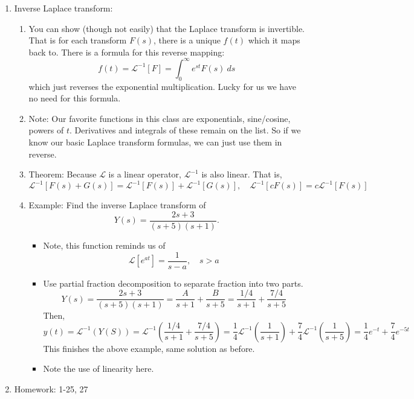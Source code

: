\documentclass{article}
\begin{document}
\begin{enumerate}
\item Inverse Laplace transform: 
\begin{enumerate}
\item You can show (though not easily) that the Laplace transform is invertible. That is for each transform $F(s)$, there is a unique $f(t)$ which it maps back to. There is a formula for this reverse mapping:
\[
f(t) =\mathcal{L}^{-1}[F] = \int_0^{\infty} e^{st} F(s) ~ds
\]
which just reverses the exponential multiplication. Lucky for us we have no need for this formula.
\item Note: Our favorite functions in this class are exponentials, sine/cosine, powers of $t$. Derivatives and integrals of these remain on the list. So if we know our basic Laplace transform formulas, we can just use them in reverse.
\item Theorem: Because $\mathcal{L}$ is a linear operator, $\mathcal{L}^{-1}$ is also linear. That is,
\[
\mathcal{L}^{-1}\left[ F(s)+G(s) \right] = \mathcal{L}^{-1}\left[ F(s) \right]+\mathcal{L}^{-1}\left[ G(s) \right], \quad
\mathcal{L}^{-1}\left[ cF(s) \right] = c\mathcal{L}^{-1}\left[ F(s) \right]
\]
\item Example: Find the inverse Laplace transform of 
\[
Y(s) = \frac{2s+3}{(s+5)(s+1)}.
\]
\begin{itemize}
\item Note, this function reminds us of
\[
\mathcal{L}[e^{at}] = \frac{1}{s-a}, \quad s>a
\]
\item Use partial fraction decomposition to separate fraction into two parts.
\[
Y(s) = \frac{2s+3}{(s+5)(s+1)} = \frac{A}{s+1}+\frac{B}{s+5} 
= \frac{1/4}{s+1}+\frac{7/4}{s+5} 
\]
Then, 
\[
y(t) = \mathcal{L}^{-1}(Y(S))
= \mathcal{L}^{-1}\left( \frac{1/4}{s+1}+\frac{7/4}{s+5}  \right)
= \frac{1}{4}\mathcal{L}^{-1}\left( \frac{1}{s+1} \right) + \frac{7}{4}\mathcal{L}^{-1}\left( \frac{1}{s+5}  \right)
= \frac{1}{4} e^{-t} + \frac{7}{4} e^{-5t}
\]
This finishes the above example, same solution as before.
\item Note the use of linearity here.
\end{itemize}
\end{enumerate}

\item Homework: 1-25, 27

\end{enumerate}
\end{document}
